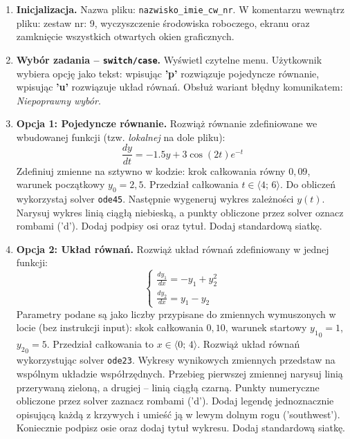\documentclass[a4paper,11pt]{article}
\begin{document}
\begin{enumerate}[leftmargin=*, label=\textbf{\arabic*.}, itemsep=2pt]

  \item \textbf{Inicjalizacja.}
    Nazwa pliku: \texttt{nazwisko\_imie\_cw\_nr}. W komentarzu wewnątrz pliku: zestaw nr: 9, wyczyszczenie środowiska roboczego, ekranu oraz zamknięcie wszystkich otwartych okien graficznych.

  \item \textbf{Wybór zadania -- \texttt{switch/case}.}
    Wyświetl czytelne menu. Użytkownik wybiera opcję jako tekst: wpisując \textbf{'p'} rozwiązuje pojedyncze równanie, wpisując \textbf{'u'} rozwiązuje układ równań. Obsłuż wariant błędny komunikatem: \textit{Niepoprawny wybór}.

  \item \textbf{Opcja 1: Pojedyncze równanie.}
    Rozwiąż równanie zdefiniowane we wbudowanej funkcji (tzw. \textit{lokalnej} na dole pliku):
    \[ \frac{dy}{dt} = -1.5y + 3\cos(2t)e^{-t} \]
    Zdefiniuj zmienne na sztywno w kodzie: krok całkowania równy $0{,}09$, warunek początkowy $y_0 = 2{,}5$. Przedział całkowania $t \in \langle 4;\,6 \rangle$.
    Do obliczeń wykorzystaj solver \texttt{ode45}. Następnie wygeneruj wykres zależności $y(t)$. Narysuj wykres linią ciągłą niebieską, a punkty obliczone przez solver oznacz rombami ('d'). Dodaj podpisy osi oraz tytuł. Dodaj standardową siatkę.

  \item \textbf{Opcja 2: Układ równań.}
    Rozwiąż układ równań zdefiniowany w jednej funkcji:\\[-0.5em]
    \[
    \begin{cases}
      \frac{dy_1}{dx} = -y_1 + y_2^2 \\
      \frac{dy_2}{dx} = y_1 - y_2
    \end{cases}
    \]
    Parametry podane są jako liczby przypisane do zmiennych wymuszonych w locie (bez instrukcji input): skok całkowania $0{,}10$, warunek startowy $ {y_1}_{0} = 1 $, $ {y_2}_{0} = 5 $. Przedział całkowania to $x \in \langle 0;\,4 \rangle$.
    Rozwiąż układ równań wykorzystując solver \texttt{ode23}. Wykresy wynikowych zmiennych przedstaw na wspólnym układzie współrzędnych. Przebieg pierwszej zmiennej narysuj linią przerywaną zieloną, a drugiej -- linią ciągłą czarną. Punkty numeryczne obliczone przez solver zaznacz rombami ('d'). Dodaj legendę jednoznacznie opisującą każdą z krzywych i umieść ją w lewym dolnym rogu ('southwest'). Koniecznie podpisz osie oraz dodaj tytuł wykresu. Dodaj standardową siatkę.

\end{enumerate}
\end{document}
